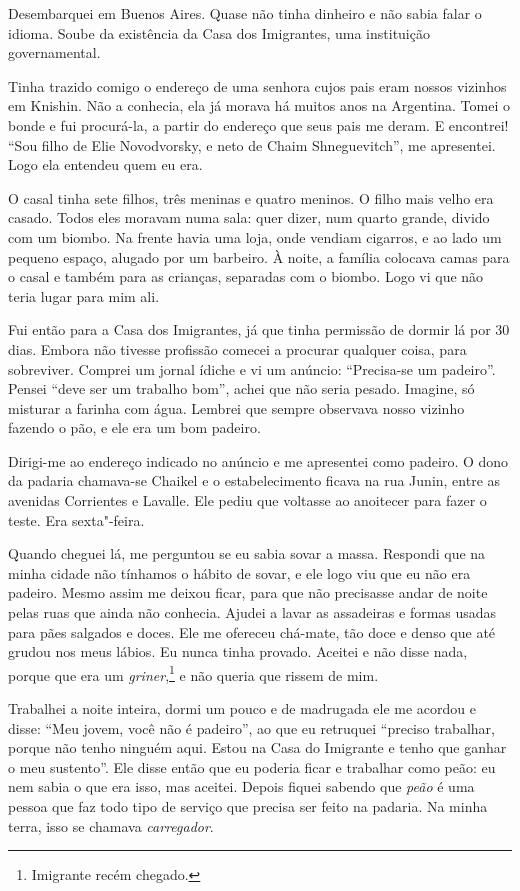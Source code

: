 Desembarquei em Buenos Aires. Quase não tinha dinheiro e não sabia falar
o idioma. Soube da existência da Casa dos Imigrantes, uma instituição governamental.

Tinha trazido comigo o endereço de uma senhora cujos pais eram nossos
vizinhos em Knishin. Não a conhecia, ela já morava há muitos anos
na Argentina. Tomei o bonde e fui procurá-la, a partir do endereço que seus pais me deram. E encontrei! ``Sou filho de Elie Novodvorsky, e neto de Chaim Shneguevitch'', me
apresentei. Logo ela entendeu quem eu era. 

O casal tinha sete filhos, três meninas e quatro meninos. O filho mais
velho era casado. Todos eles moravam numa sala: quer dizer, num quarto
grande, divido com um biombo. Na frente havia uma loja, onde vendiam cigarros, e ao lado um pequeno espaço, alugado por um
barbeiro. À noite, a família colocava camas para o casal e também para as
crianças, separadas com o biombo. Logo vi que não teria lugar para
mim ali.

Fui então para a Casa dos Imigrantes, já que tinha permissão de dormir
lá por 30 dias. Embora não tivesse profissão comecei a procurar qualquer
coisa, para sobreviver. Comprei um jornal ídiche e vi um anúncio:
``Precisa-se um padeiro''. Pensei ``deve ser um trabalho bom'', achei
que não seria pesado. Imagine, só misturar a farinha com água. Lembrei que sempre observava nosso vizinho fazendo o pão, e ele era um
bom padeiro.

Dirigi-me ao endereço indicado no anúncio e me apresentei como padeiro.
O dono da padaria chamava-se Chaikel e o estabelecimento ficava na rua
Junin, entre as avenidas Corrientes e Lavalle. Ele pediu que voltasse ao
anoitecer para fazer o teste. Era sexta"-feira. 

Quando cheguei lá, me perguntou se eu sabia sovar a massa. Respondi que na minha cidade não
tínhamos o hábito de sovar, e ele logo viu que eu não era padeiro.
Mesmo assim me deixou ficar, para que não precisasse andar de noite pelas ruas que
ainda não conhecia. Ajudei a lavar as assadeiras e formas usadas para pães salgados e doces. Ele me ofereceu chá-mate, tão doce e denso que até grudou nos
meus lábios. Eu nunca tinha provado. Aceitei e não disse nada, porque
que era um \textit{griner},\footnote{Imigrante recém chegado.} e não queria
que rissem de mim.

Trabalhei a noite inteira, dormi um pouco e de madrugada ele me acordou
e disse: ``Meu jovem, você não é padeiro'', ao que eu retruquei ``preciso
trabalhar, porque não tenho ninguém aqui. Estou na Casa do Imigrante e
tenho que ganhar o meu sustento''. Ele disse então que eu poderia ficar
e trabalhar como peão: eu nem sabia o que era isso, mas aceitei. Depois
fiquei sabendo que \textit{peão} é uma pessoa que faz todo tipo de serviço
que precisa ser feito na padaria. Na minha terra, isso se chamava \textit{carregador}.


